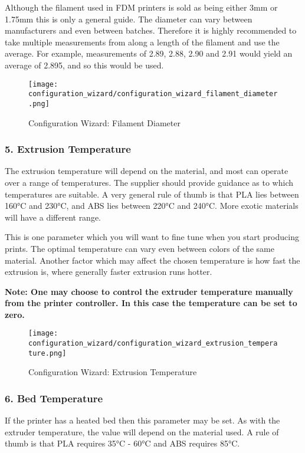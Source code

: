 Although the filament used in FDM printers is sold as being either 3mm or 1.75mm this is only a general guide.  The diameter can vary between manufacturers and even between batches.  Therefore it is highly recommended to take multiple measurements from along a length of the filament and use the average.  For example, measurements of 2.89, 2.88, 2.90 and 2.91 would yield an average of 2.895, and so this would be used.

\begin{figure}[H]
\centering
\texttt{[image: configuration\_wizard/configuration\_wizard\_filament\_diameter.png]}
\caption{Configuration Wizard: Filament Diameter}
\label{fig:configuration_wizard_filament_diameter}
\end{figure}

\newpage
\subsubsection{5. Extrusion Temperature}
\label{sub:5_extrusion_temperature}
The extrusion temperature will depend on the material, and most can operate over a range of temperatures.  The supplier should provide guidance as to which temperatures are suitable.  A very general rule of thumb is that PLA lies between 160°C and 230°C, and ABS lies between 220°C and 240°C. More exotic materials will have a different range.

This is one parameter which you will want to fine tune when you start producing prints.  The optimal temperature can vary even between colors of the same material.  Another factor which may affect the chosen temperature is how fast the extrusion is, where generally faster extrusion runs hotter.

\textbf{Note: One may choose to control the extruder temperature manually from the printer controller. In this case the temperature can be set to zero.}

\begin{figure}[H]
\centering
\texttt{[image: configuration\_wizard/configuration\_wizard\_extrusion\_temperature.png]}
\caption{Configuration Wizard: Extrusion Temperature}
\label{fig:configuration_wizard_extrusion_temperature}
\end{figure}

\newpage
\subsubsection{6. Bed Temperature}
\label{sub:6_bed_temperature}
If the printer has a heated bed then this parameter may be set.  As with the extruder temperature, the value will depend on the material used.  A rule of thumb is that PLA requires 35°C - 60°C and ABS requires 85°C.

